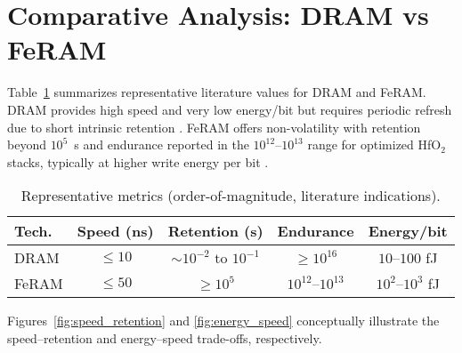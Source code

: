 \section{Comparative Analysis: DRAM vs FeRAM}
\label{sec:comparison}

Table~\ref{tab:comparison} summarizes representative literature values for DRAM and FeRAM. DRAM provides high speed and very low energy/bit but requires periodic refresh due to short intrinsic retention \cite{choi2022,kim2021_dram,iedm2023_dram}. FeRAM offers non-volatility with retention beyond $10^{5}$~s and endurance reported in the $10^{12}$--$10^{13}$ range for optimized HfO$_2$ stacks, typically at higher write energy per bit \cite{boscke2011,mueller2012,noheda2023,martin2020}.

\begin{table}[!t]
\centering
\caption{Representative metrics (order-of-magnitude, literature indications).}
\label{tab:comparison}
\begin{tabular}{lcccc}
\toprule
Tech. & Speed (ns) & Retention (s) & Endurance & Energy/bit \\
\midrule
DRAM  & $\le 10$  & $\sim 10^{-2}$ to $10^{-1}$ & $\ge 10^{16}$ & $10$--$100$ fJ \\
FeRAM & $\le 50$  & $\ge 10^{5}$                & $10^{12}$--$10^{13}$ & $10^{2}$--$10^{3}$ fJ \\
\bottomrule
\end{tabular}
\end{table}

Figures~\ref{fig:speed_retention} and \ref{fig:energy_speed} conceptually illustrate the speed--retention and energy--speed trade-offs, respectively.

